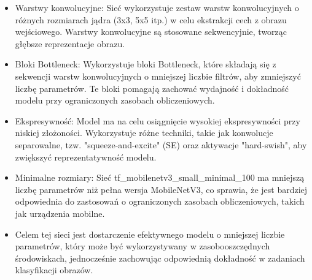 \documentclass[12pt,twoside]{article}
\begin{document}
\begin{itemize}

\item Warstwy konwolucyjne: Sieć wykorzystuje zestaw warstw konwolucyjnych o różnych rozmiarach jądra (3x3, 5x5 itp.) w celu ekstrakcji cech z obrazu wejściowego. Warstwy konwolucyjne są stosowane sekwencyjnie, tworząc głębsze reprezentacje obrazu.

\item Bloki Bottleneck: Wykorzystuje bloki Bottleneck, które składają się z sekwencji warstw konwolucyjnych o mniejszej liczbie filtrów, aby zmniejszyć liczbę parametrów. Te bloki pomagają zachować wydajność i dokładność modelu przy ograniczonych zasobach obliczeniowych.

\item Ekspresywność: Model ma na celu osiągnięcie wysokiej ekspresywności przy niskiej złożoności. Wykorzystuje różne techniki, takie jak konwolucje separowalne, tzw. "squeeze-and-excite" (SE) oraz aktywacje "hard-swish", aby zwiększyć reprezentatywność modelu.

\item Minimalne rozmiary: Sieć tf\_mobilenetv3\_small\_minimal\_100 ma mniejszą liczbę parametrów niż pełna wersja MobileNetV3, co sprawia, że jest bardziej odpowiednia do zastosowań o ograniczonych zasobach obliczeniowych, takich jak urządzenia mobilne.

\item Celem tej sieci jest dostarczenie efektywnego modelu o mniejszej liczbie parametrów, który może być wykorzystywany w zasobooszczędnych środowiskach, jednocześnie zachowując odpowiednią dokładność w zadaniach klasyfikacji obrazów.
\end{itemize}
\end{document}
